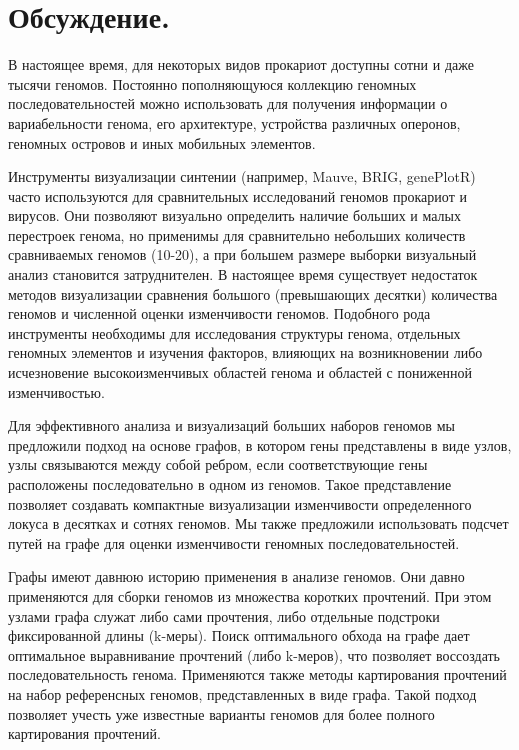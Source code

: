 \graphicspath{{Dissertation/images/}}

\chapter{Обсуждение. } \label{chaptDiscussion}


В настоящее время, для некоторых видов прокариот доступны сотни и даже тысячи геномов. Постоянно пополняющуюся коллекцию геномных последовательностей можно использовать для получения информации о вариабельности генома, его архитектуре, устройства различных оперонов, геномных островов и иных мобильных элементов.

Инструменты визуализации синтении (например, Mauve, BRIG, genePlotR) часто используются для сравнительных исследований геномов прокариот и вирусов. Они позволяют визуально определить наличие больших и малых перестроек генома, но применимы для сравнительно небольших количеств сравниваемых геномов (10-20), а при большем размере выборки визуальный анализ становится затруднителен. В настоящее время существует недостаток методов визуализации сравнения большого (превышающих десятки) количества геномов и численной оценки изменчивости геномов. Подобного рода инструменты необходимы для исследования структуры генома, отдельных геномных элементов и изучения факторов, влияющих на возникновении либо исчезновение высокоизменчивых областей генома и областей с пониженной изменчивостью.

Для эффективного анализа и визуализаций больших наборов геномов мы предложили подход на основе графов, в котором гены представлены в виде узлов, узлы связываются между собой ребром, если соответствующие гены расположены последовательно в одном из геномов. Такое представление позволяет создавать компактные визуализации изменчивости определенного локуса в десятках и сотнях геномов. Мы также предложили использовать подсчет путей на графе для оценки изменчивости геномных последовательностей. 

Графы имеют давнюю историю применения в анализе геномов. Они давно применяются для сборки геномов из множества коротких прочтений. При этом узлами графа служат либо сами прочтения, либо отдельные подстроки фиксированной длины (k-меры). Поиск оптимального обхода на графе дает оптимальное выравнивание прочтений (либо k-меров), что позволяет воссоздать последовательность генома. Применяются также методы картирования прочтений на набор референсных геномов, представленных в виде графа. Такой подход позволяет учесть уже известные варианты геномов для более полного картирования прочтений. 

